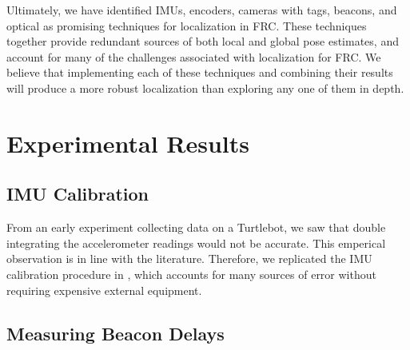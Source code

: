 \documentclass{article}
\begin{document}
  Ultimately, we have identified IMUs, encoders, cameras with tags, beacons, and optical as promising techniques for localization in FRC. These techniques together provide redundant sources of both local and global pose estimates, and account for many of the challenges associated with localization for FRC. We believe that implementing each of these techniques and combining their results will produce a more robust localization than exploring any one of them in depth.

\section{Experimental Results} \label{experiments}

  \subsection{IMU Calibration}
    From an early experiment collecting data on a Turtlebot, we saw that double integrating the accelerometer readings would not be accurate. This emperical observation is in line with the literature. Therefore, we replicated the IMU calibration procedure in \cite{tedaldi_robust_2014}, which accounts for many sources of error without requiring expensive external equipment.

  \subsection{Measuring Beacon Delays}
\end{document}
